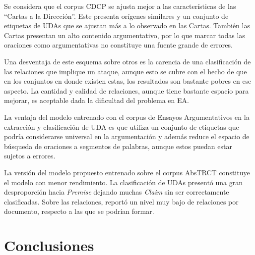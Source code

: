 \documentclass[a4paper,11pt,twocolumn,twoside]{article}
\begin{document}
Se considera que el corpus CDCP se ajusta mejor a las características de las ``Cartas 
a la Dirección''. Este presenta orígenes similares y un conjunto de etiquetas de UDAs que se ajustan más a lo observado 
en las Cartas. También las Cartas presentan un alto contenido argumentativo, por lo que marcar 
todas las oraciones como argumentativas no constituye una fuente grande de errores.

Una desventaja de este esquema sobre otros es la carencia de una 
clasificación de las relaciones que implique un ataque, aunque esto se cubre con el hecho de 
que en los conjuntos en donde existen estas, los resultados son bastante pobres en ese aspecto. La cantidad 
y calidad de relaciones, aunque tiene bastante espacio para mejorar, es aceptable dada la dificultad 
del problema en EA.

La ventaja del modelo entrenado con el corpus de Ensayos Argumentativos en la extracción 
y clasificación de UDA es que utiliza un conjunto de etiquetas que 
podría considerarse universal en la argumentación y además reduce el espacio de búsqueda de 
oraciones a segmentos de palabras, aunque estos puedan estar sujetos a errores. 

La versión del modelo propuesto entrenado sobre el corpus AbsTRCT constituye el modelo 
con menor rendimiento. La clasificación
de UDAs presentó una gran desproporción hacia \textit{Premise} dejando muchas \textit{Claim}
sin ser correctamente clasificadas. Sobre las relaciones, reportó un nivel muy bajo de 
relaciones por documento, respecto a las que se podrían formar.

\section{Conclusiones}
\end{document}
